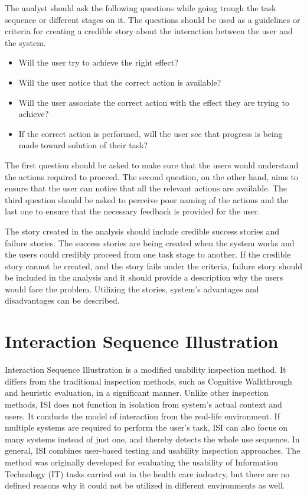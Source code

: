 \documentclass[12pt,a4paper,oneside,pdftex]{report}
\begin{document}
The analyst should ask the following questions while going trough the task sequence or different stages on it. The questions should be used as a guidelines or criteria for creating a credible story about the interaction between the user and the system. \citep{RefWorks:26}
\begin{itemize}
\item Will the user try to achieve the right effect?
\item Will the user notice that the correct action is available?
\item Will the user associate the correct action with the effect they are trying to achieve?
\item If the correct action is performed, will the user see that progress is being made toward solution of their task?
\end{itemize}

The first question should be asked to make sure that the users would understand the actions required to proceed. The second question, on the other hand, aims to ensure that the user can notice that all the relevant actions are available.
The third question should be asked to perceive poor naming of the actions and the last one to ensure that the necessary feedback is provided for the user. 

The story created in the analysis should include credible success stories and failure stories. The success stories are being created when the system works and the users could credibly proceed from one task stage to another. If the credible story cannot be created, and the story fails under the criteria, failure story should be included in the analysis and it should provide a description why the users would face the problem. Utilizing the stories, system's advantages and disadvantages can be described. \citep{RefWorks:26} 		

\section{Interaction Sequence Illustration}
\label{sec:isi}
Interaction Sequence Illustration is a modified usability inspection method. It differs from the traditional inspection methods, such as Cognitive Walkthrough and heuristic evaluation, in a significant manner. Unlike other inspection methods, ISI does not function in isolation from system's actual context and users. It conducts the model of interaction from the real-life environment. If multiple systems are required to perform the user's task, ISI can also focus on many systems instead of just one, and thereby detects the whole use sequence. In general, ISI combines user-based testing and usability inspection approaches. The method was originally developed for evaluating the usability of Information Technology (IT) tasks carried out in the health care industry, but there are no defined reasons why it could not be utilized in different environments as well.  \citep{RefWorks:17} 
\end{document}
